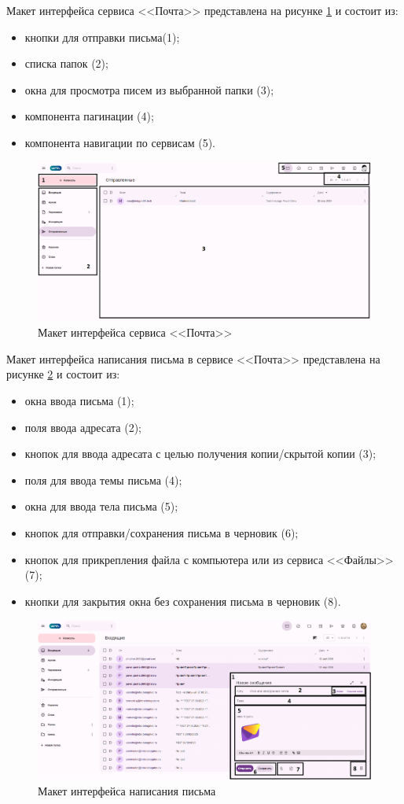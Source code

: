 Макет интерфейса сервиса <<Почта>> представлена на рисунке \ref{templ:image1} и состоит из:
\begin{itemize}
  \item кнопки для отправки письма(1);
  \item списка папок (2);
  \item окна для просмотра писем из выбранной папки (3);
  \item компонента пагинации (4);
  \item компонента навигации по сервисам (5).
\end{itemize}
\begin{figure}[H]
	\centering
	\includegraphics[width=1\linewidth]{images/почта}
	\caption{Макет интерфейса сервиса <<Почта>>}
	\label{templ:image1}
\end{figure}

Макет интерфейса написания письма в сервисе <<Почта>> представлена на рисунке \ref{templ:image1b} и состоит из:
\begin{itemize}
  \item окна ввода письма (1);
  \item поля ввода адресата (2);
  \item кнопок для ввода адресата с целью получения копии/скрытой копии (3);
  \item поля для ввода темы письма (4);
  \item окна для ввода тела письма (5);
  \item кнопок для отправки/сохранения письма в черновик (6);
  \item кнопок для прикрепления файла с компьютера или из сервиса <<Файлы>> (7);
  \item кнопки для закрытия окна без сохранения письма в черновик (8).
\end{itemize}
\begin{figure}[H]
	\centering
	\includegraphics[width=1\linewidth]{images/почта2}
	\caption{Макет интерфейса написания письма}
	\label{templ:image1b}
\end{figure}

